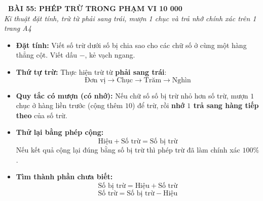 \documentclass[11pt,a4paper]{article}
\begin{document}
\begin{tcolorbox}[
  enhanced,
  colback=white,
  colframe=primary,
  arc=3mm,
  boxrule=1.2pt,
  left=4mm, right=4mm, top=2.5mm, bottom=2.5mm,
  drop shadow=black!10!white
]
  \centering
  {\Large\bfseries\color{primary}\faBookmark\ BÀI 55: PHÉP TRỪ TRONG PHẠM VI 10 000}\\[1.5mm]
  {\small\itshape\color{black!75}Kĩ thuật đặt tính, trừ từ phải sang trái, mượn 1 chục và trả nhớ chính xác trên 1 trang A4}
\end{tcolorbox}

\vspace{-2mm}


\noindent
\begin{minipage}[t]{0.49\textwidth}\vspace{0pt}
\begin{tcolorbox}[
  enhanced,
  colback=blue!4!white,
  colframe=blue!75!black,
  arc=2mm, boxrule=0.8pt,
  left=2mm, right=2mm, top=1.8mm, bottom=1.8mm,
  title={\footnotesize\bfseries\color{white}\faKey\ 1. Quy trình Đặt tính và Trừ}
]
{\footnotesize
\begin{itemize}\setlength{\itemsep}{1.5pt}\setlength{\leftskip}{-2.5mm}
  \item \textbf{Đặt tính:} Viết số trừ dưới số bị chia sao cho các chữ số ở cùng một hàng thẳng cột. Viết dấu $-$, kẻ vạch ngang.
  \item \textbf{Thứ tự trừ:} Thực hiện trừ từ \textbf{phải sang trái}:
  $$\text{Đơn vị} \to \text{Chục} \to \text{Trăm} \to \text{Nghìn}$$
  \item \textbf{Quy tắc có mượn (có nhớ):}
  Nếu chữ số số bị trừ nhỏ hơn số trừ, mượn $1$ chục ở hàng liền trước (cộng thêm $10$) để trừ, rồi \textbf{nhớ $1$ trả sang hàng tiếp theo} của số trừ.
\end{itemize}
}
\end{tcolorbox}
\end{minipage}
\hfill
\begin{minipage}[t]{0.49\textwidth}\vspace{0pt}
\begin{tcolorbox}[
  enhanced,
  colback=teal!4!white,
  colframe=teal!75!black,
  arc=2mm, boxrule=0.8pt,
  left=2mm, right=2mm, top=1.8mm, bottom=1.8mm,
  title={\footnotesize\bfseries\color{white}\faCheckSquare\ 2. Kĩ năng thử lại phép trừ}
]
{\footnotesize
\begin{itemize}\setlength{\itemsep}{1.5pt}\setlength{\leftskip}{-2.5mm}
  \item \textbf{Thử lại bằng phép cộng:}
  $$\text{Hiệu} + \text{Số trừ} = \text{Số bị trừ}$$
  Nếu kết quả cộng lại đúng bằng số bị trừ thì phép trừ đã làm chính xác $100\%$.
  \item \textbf{Tìm thành phần chưa biết:}
  $$\text{Số bị trừ} = \text{Hiệu} + \text{Số trừ}$$
  $$\text{Số trừ} = \text{Số bị trừ} - \text{Hiệu}$$
\end{itemize}
}
\end{tcolorbox}
\end{minipage}
\end{document}
